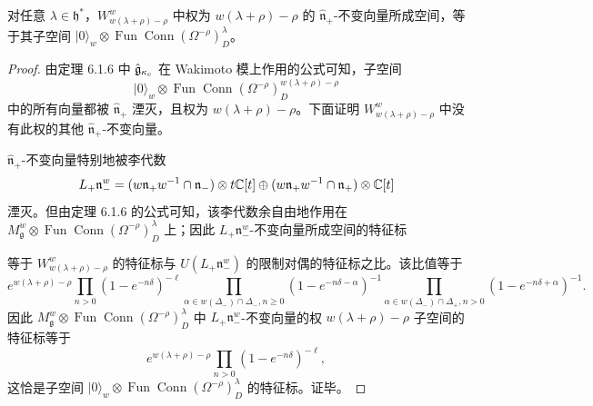 \begin{lemma}
    对任意 $\lambda\in\mathfrak{h}^*$，$W^w_{w(\lambda+\rho)-\rho}$ 中权为 $w(\lambda+\rho)-\rho$ 的 $\hat{\mathfrak{n}}_+$-不变向量所成空间，等于其子空间 $|0\rangle_w\otimes\operatorname{Fun}\operatorname{Conn}(\Omega^{-\rho})^\lambda_D$。
\end{lemma}

\begin{proof}
    由定理 6.1.6 中 $\hat{\mathfrak{g}}_{\kappa_c}$ 在 Wakimoto 模上作用的公式可知，子空间
    \[
        |0\rangle_w\otimes\operatorname{Fun}\operatorname{Conn}(\Omega^{-\rho})^{w(\lambda+\rho)-\rho}_D
    \]
    中的所有向量都被 $\hat{\mathfrak{n}}_+$ 湮灭，且权为 $w(\lambda+\rho)-\rho$。下面证明 $W^w_{w(\lambda+\rho)-\rho}$ 中没有此权的其他 $\hat{\mathfrak{n}}_+$-不变向量。

    $\hat{\mathfrak{n}}_+$-不变向量特别地被李代数
    \[
        L_+\mathfrak{n}^w_-=(w\mathfrak{n}_+w^{-1}\cap\mathfrak{n}_-)\otimes t\mathbb{C}[t]
        \oplus(w\mathfrak{n}_+w^{-1}\cap\mathfrak{n}_+)\otimes\mathbb{C}[t]
    \]
    湮灭。但由定理 6.1.6 的公式可知，该李代数余自由地作用在 $M^w_{\mathfrak{g}}\otimes\operatorname{Fun}\operatorname{Conn}(\Omega^{-\rho})^\lambda_D$ 上；因此 $L_+\mathfrak{n}^w_-$-不变向量所成空间的特征标

    等于 $W^w_{w(\lambda+\rho)-\rho}$ 的特征标与 $U(L_+\mathfrak{n}^w_-)$ 的限制对偶的特征标之比。该比值等于
    \[
        e^{w(\lambda+\rho)-\rho}\prod_{n>0}(1-e^{-n\delta})^{-\ell}
        \prod_{\alpha\in w(\Delta_-)\cap\Delta_-,n\ge0}(1-e^{-n\delta-\alpha})^{-1}
        \prod_{\alpha\in w(\Delta_-)\cap\Delta_+,n>0}(1-e^{-n\delta+\alpha})^{-1}.
    \]
    因此 $M^w_{\mathfrak{g}}\otimes\operatorname{Fun}\operatorname{Conn}(\Omega^{-\rho})^\lambda_D$ 中 $L_+\mathfrak{n}^w_-$-不变向量的权 $w(\lambda+\rho)-\rho$ 子空间的特征标等于
    \[
        e^{w(\lambda+\rho)-\rho}\prod_{n>0}(1-e^{-n\delta})^{-\ell},
    \]
    这恰是子空间 $|0\rangle_w\otimes\operatorname{Fun}\operatorname{Conn}(\Omega^{-\rho})^\lambda_D$ 的特征标。证毕。
\end{proof}


